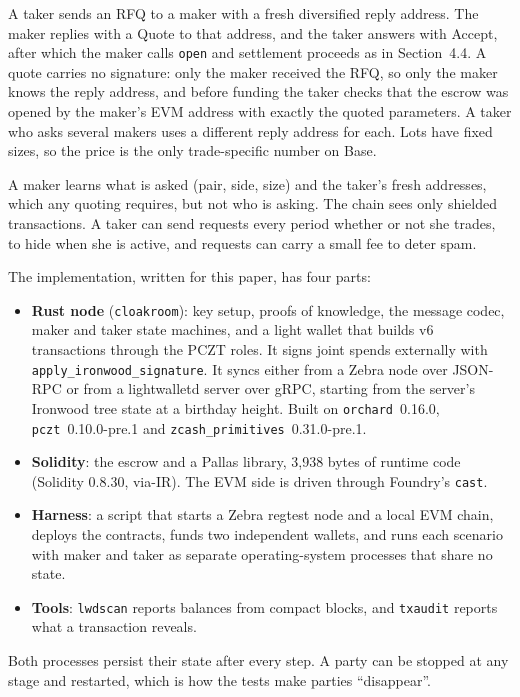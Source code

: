 \documentclass[10pt,letterpaper]{article}
\makeatletter
\renewcommand\section{\@startsection{section}{1}{\z@}{-1.3em}{0.45em}{\normalfont\large\bfseries}}
\newcommand{\fn}[1]{\texttt{#1}}
\makeatother
\begin{document}
A taker sends an \textsf{RFQ} to a maker with a fresh diversified reply address. The maker
replies with a \textsf{Quote} to that address, and the taker answers with \textsf{Accept}, after
which the maker calls \fn{open} and settlement proceeds as in Section~4.4. A quote carries no
signature: only the maker received the RFQ, so only the maker knows the reply address, and before
funding the taker checks that the escrow was opened by the maker's EVM address with exactly the quoted
parameters. A taker who asks several makers uses a different reply address for each. Lots have fixed
sizes, so the price is the only trade-specific number on Base.

A maker learns what is asked (pair, side, size) and the taker's fresh addresses, which any quoting
requires, but not who is asking. The chain sees only shielded transactions. A taker can send
requests every period whether or not she trades, to hide when she is active, and requests can carry a
small fee to deter spam.

\section{Implementation}

The implementation, written for this paper, has four parts:
\begin{itemize}\setlength\itemsep{0.1em}
\item \textbf{Rust node} (\fn{cloakroom}): key setup, proofs of knowledge, the message codec, maker
and taker state machines, and a light wallet that builds v6 transactions through the PCZT roles. It
signs joint spends externally with \fn{apply\_ironwood\_signature}. It syncs either from a Zebra
node over JSON-RPC or from a lightwalletd server over gRPC, starting from the server's Ironwood tree
state at a birthday height. Built on \fn{orchard}~0.16.0, \fn{pczt}~0.10.0-pre.1 and
\fn{zcash\_primitives}~0.31.0-pre.1.
\item \textbf{Solidity}: the escrow and a Pallas library, 3{,}938 bytes of runtime code
(Solidity 0.8.30, via-IR). The EVM side is driven through Foundry's \fn{cast}.
\item \textbf{Harness}: a script that starts a Zebra regtest node and a local EVM chain, deploys the
contracts, funds two independent wallets, and runs each scenario with maker and taker as separate
operating-system processes that share no state.
\item \textbf{Tools}: \fn{lwdscan} reports balances from compact blocks, and \fn{txaudit} reports
what a transaction reveals.
\end{itemize}
Both processes persist their state after every step. A party can be stopped at any stage and
restarted, which is how the tests make parties ``disappear''.
\end{document}
